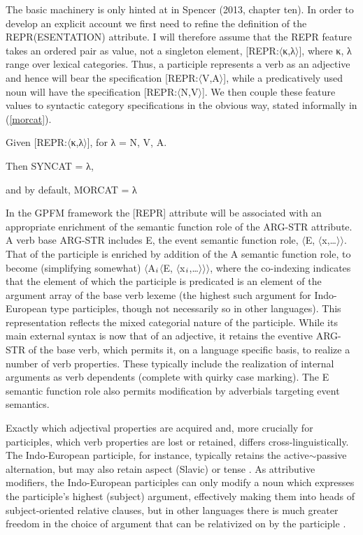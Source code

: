 \documentclass[output=paper,
modfonts
]{LSP/langsci}
\begin{document}
\begin{sloppypar}The basic machinery is only hinted at in Spencer (2013, chapter ten). In order to develop an explicit account we first need to refine the definition of the REPR(ESENTATION) attribute. I will therefore assume that the REPR feature takes an ordered pair as value, not a singleton element, [REPR:$\langle$κ,λ$\rangle$], where κ, λ range over lexical categories. Thus, a participle represents a verb as an adjective and hence will bear the specification [REPR:$\langle$V,A$\rangle$], while a predicatively used noun will have the specification [REPR:$\langle$N,V$\rangle$]. We then couple these feature values to syntactic category specifications in the obvious way, stated  informally in (\ref{morcat}).\end{sloppypar}

\begin{exe}	\ex	\label{morcat}

Given [REPR:$\langle$κ,λ$\rangle$], for λ = N, V, A. 

Then SYNCAT = λ,

and by default, MORCAT = λ
\end{exe}


In  the GPFM framework the [REPR] attribute will be associated with an appropriate enrichment of the semantic function role of the ARG-STR attribute. A  verb base ARG-STR includes E, the event semantic function role, $\langle$E, $\langle$x,\ldots$\rangle\rangle$. That of the participle is enriched by addition of the A semantic function role, to  become (simplifying somewhat) $\langle$A$\sb{i}$$\langle$E, $\langle$x$\sb{i}$,\ldots$\rangle\rangle\rangle$, 
where the co-indexing indicates that the element of which the  participle is predicated is an element of the argument array of the base verb lexeme (the highest such argument for Indo-European type participles, though not necessarily so in other languages). 
This representation reflects the mixed categorial nature of the participle. While its main external syntax \parencite{Haspelmath96} is now that of an adjective, it retains the eventive ARG-STR  of the base verb, which permits it, on a language specific basis, to realize a number of verb properties. These typically include the realization of internal arguments as verb dependents (complete with quirky case marking). The E semantic function role also permits modification by adverbials targeting event semantics. 

Exactly which adjectival properties are acquired and, more crucially for participles, which verb properties are lost or retained, differs cross-linguistically. The Indo-European participle, for instance, typically retains the active$\sim$passive alternation, but may also retain aspect (Slavic) or tense  \parencite[Sanskrit; ][]{Lowe15:book}. As attributive modifiers, the  Indo-European participles can only modify a noun which expresses the participle’s highest (subject) argument, effectively making them into heads of subject-oriented relative clauses, but in other languages there is much greater freedom in the choice of argument that can be relativized on by the participle %
\parencite[for discussion see][]{Spencer16:ptcprels}. 
\end{document}
